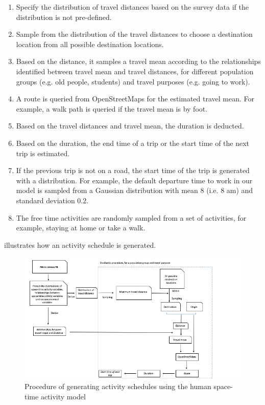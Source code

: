 \documentclass[]{article}
\begin{document}
\begin{enumerate}
    \item Specify the distribution of travel distances based on the survey data if the distribution is not pre-defined. 
    \item Sample from the distribution of the travel distances to choose a destination location from all possible destination locations.
    \item Based on the distance, it samples a travel mean according to the relationships identified between travel mean and travel distances, for different population groups  (e.g. old people, students) and travel purposes (e.g. going to work).
    \item A route is queried from OpenStreetMaps for the estimated travel mean. For example, a walk path is queried if the travel mean is by foot.  
    \item Based on the travel distances and travel mean, the duration is deducted. 
    \item Based on the duration, the end time of a trip or the start time of the next trip is estimated. 
    \item If the previous trip is not on a road, the start time of the trip is generated with a distribution. For example, the default departure time to work in our model is sampled from a Gaussian distribution with mean 8 (i.e. 8 am) and standard deviation 0.2. 
    \item The free time activities are randomly sampled from a set of activities, for example, staying at home or take a walk. 
\end{enumerate}

 illustrates how an activity schedule is generated. 

\begin{figure}[h]
    \centering
    \includegraphics[width=\linewidth]{figure/detail.png}
    \caption{Procedure of generating activity schedules using the human space-time activity model}
    \label{fig:detail}
\end{figure}
\end{document}
